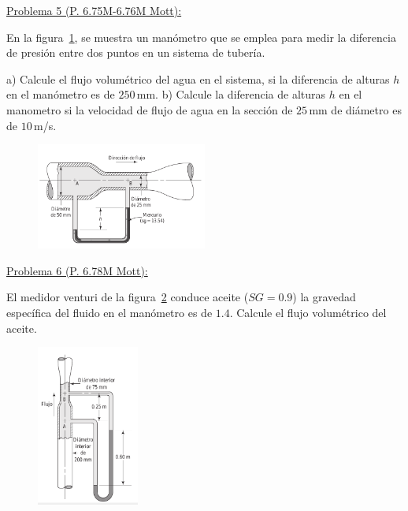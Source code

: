 \documentclass[11pt]{report}
\begin{document}

\underline {Problema 5 (P. 6.75M-6.76M Mott):}

\vspace{0.2cm}

En la figura~\ref{fig:fig5}, se muestra un man\'ometro que se emplea para medir la diferencia de presi\'on entre dos puntos en un sistema de tuber\'ia. \newline

a) Calcule el flujo volum\'etrico del agua en el sistema, si la diferencia de alturas $h$ en el man\'ometro es de $250$\,mm.\newline
b) Calcule la diferencia de alturas $h$ en el manometro si la velocidad de flujo de agua en la secci\'on de $25$\,mm de di\'ametro es de $10$\,m/s.

 
\begin{figure}[H]
\centering\includegraphics[width=0.5\textwidth]{p5.png}
\caption{\label{fig:fig5}}
\end{figure}



\underline {Problema 6 (P. 6.78M Mott):}

\vspace{0.2cm}

El medidor venturi de la figura~\ref{fig:fig6} conduce aceite ($SG=0.9$) la gravedad espec\'ifica del fluido en el man\'ometro es de $1.4$. Calcule el flujo volum\'etrico del aceite.

\begin{figure}[H]
\centering\includegraphics[width=0.3\textwidth]{p6.png}
\caption{\label{fig:fig6}}
\end{figure}
\end{document}
